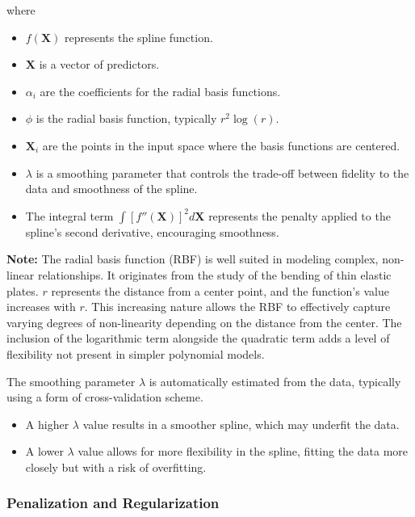 \documentclass[12pt, twoside,hidelinks]{article}
\theoremstyle{definition}
\numberwithin{equation}{section}
\begin{document}
where 

\begin{itemize}
    \item \( f(\boldsymbol{X}) \) represents the spline function.
    \item \( \boldsymbol{X} \) is a vector of predictors.
    \item \( \alpha_i \) are the coefficients for the radial basis functions.
    \item \( \phi \) is the radial basis function, typically \( r^2 \log(r) \).
    \item \( \boldsymbol{X}_i \) are the points in the input space where the basis functions are centered.
    \item \( \lambda \) is a smoothing parameter that controls the trade-off between fidelity to the data and smoothness of the spline.
    \item The integral term \( \int [f''(\boldsymbol{X})]^2 d\boldsymbol{X} \) represents the penalty applied to the spline's second derivative, encouraging smoothness.
\end{itemize}

\textbf{Note:} The radial basis function (RBF) is well suited in modeling complex, non-linear relationships. It originates from the study of the bending of thin elastic plates. \( r \) represents the distance from a center point, and the function's value increases with \( r \). This increasing nature allows the RBF to effectively capture varying degrees of non-linearity depending on the distance from the center. The inclusion of the logarithmic term alongside the quadratic term adds a level of flexibility not present in simpler polynomial models.
\newline

The smoothing parameter \( \lambda \) is automatically estimated from the data, typically using a form of cross-validation scheme.

\begin{itemize}
    \item A higher \( \lambda \) value results in a smoother spline, which may underfit the data.
    \item A lower \( \lambda \) value allows for more flexibility in the spline, fitting the data more closely but with a risk of overfitting.
\end{itemize}

\subsubsection{Penalization and Regularization}
\end{document}
